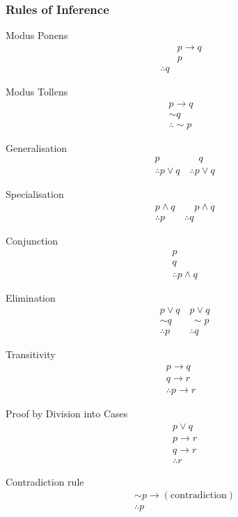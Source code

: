 \subsubsection{Rules of Inference}
\begin{multicols}{2}
Modus Ponens
\begin{align*}
    &p\rightarrow q \\
    &p \\
    \therefore q
\end{align*}

Modus Tollens
\begin{align*}
    p\rightarrow q \\
    \sim q\\
    \therefore \sim p
\end{align*}

Generalisation
\begin{align*}
    &p \qquad\qquad q\\
    &\therefore p\lor q \quad\therefore p\lor q
\end{align*}

Specialisation
\begin{align*}
    &p\land q\qquad p\land q \\
    &\therefore p \qquad \therefore q
\end{align*}

Conjunction
\begin{align*}
    &p\\
    &q\\
    &\therefore p\land q
\end{align*}

Elimination
\begin{align*}
    &p\lor q \quad p\lor q\\
    &\sim q \qquad \sim p\\
    &\therefore p \qquad \therefore q
\end{align*}

Transitivity
\begin{align*}
    p\rightarrow q \\
    q\rightarrow r \\
    \therefore p\rightarrow r
\end{align*}

Proof by Division into Cases
\begin{align*}
    &p\lor q \\
    &p\rightarrow r\\
    &q\rightarrow r\\
    &\therefore r
\end{align*}

Contradiction rule
\begin{align*}
    &\sim p\rightarrow \left(\text{contradiction}\right)\\
    &\therefore p
\end{align*}
\end{multicols}

